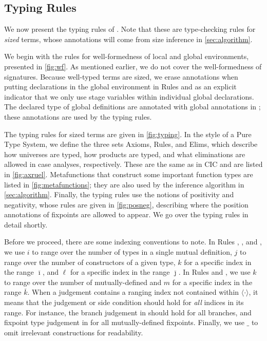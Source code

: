 \documentclass[acmsmall,nonacm,screen,review,anonymous,10pt]{acmart}
\begin{document}


\subsection{Typing Rules}









We now present the typing rules of \lang. Note that these are type-checking rules for \textit{sized} terms, whose annotations will come from size inference in \autoref{sec:algorithm}.

We begin with the rules for well-formedness of local and global environments, presented in \autoref{fig:wf}. As mentioned earlier, we do not cover the well-formedness of signatures. Because well-typed terms are sized, we erase annotations when putting declarations in the global environment in Rules  and  as an explicit indicator that we only use stage variables within individual global declarations. The declared type of global definitions are annotated with global annotations in ; these annotations are used by the typing rules.

The typing rules for sized terms are given in \autoref{fig:typing}. In the style of a Pure Type System, we define the three sets Axioms, Rules, and Elims, which describe how universes are typed, how products are typed, and what eliminations are allowed in case analyses, respectively. These are the same as in CIC and are listed in \autoref{fig:axruel}. Metafunctions that construct some important function types are listed in \autoref{fig:metafunctions}; they are also used by the inference algorithm in \autoref{sec:algorithm}. Finally, the typing rules use the notions of positivity and negativity, whose rules are given in \autoref{fig:posneg}, describing where the position annotations of fixpoints are allowed to appear. We go over the typing rules in detail shortly.

Before we proceed, there are some indexing conventions to note. In Rules , , and , we use $i$ to range over the number of \coinductive types in a single mutual \coinductive definition, $j$ to range over the number of constructors of a given \coinductive type, $k$ for a specific index in the range $\overline{\imath}$, and $\ell$ for a specific index in the range $\overline{\jmath}$. In Rules  and , we use $k$ to range over the number of mutually-defined \cofixpoints and $m$ for a specific index in the range $\overline{k}$. When a judgement contains a ranging index not contained within $\langle \cdot \rangle$, it means that the judgement or side condition should hold for \textit{all} indices in its range. For instance, the branch judgement in  should hold for all branches, and fixpoint type judgement in  for all mutually-defined fixpoints. Finally, we use $\_$ to omit irrelevant constructions for readability.
\end{document}
